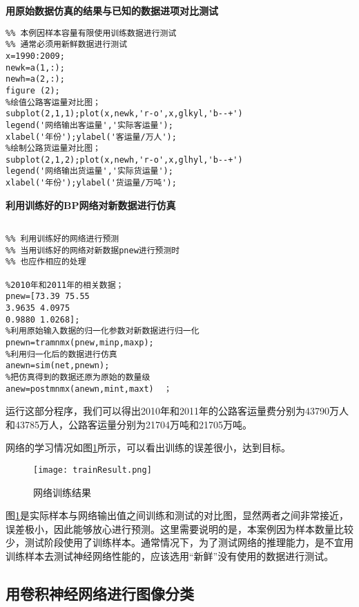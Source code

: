 \documentclass[bwprint]{cumcmthesis}
\begin{document}
\textbf{用原始数据仿真的结果与已知的数据进项对比测试}

\lstset{language=MatLab}
\begin{lstlisting}
%% 本例因样本容量有限使用训练数据进行测试
%% 通常必须用新鲜数据进行测试
x=1990:2009;
newk=a(1,:);
newh=a(2,:);
figure (2);
%绘值公路客运量对比图；
subplot(2,1,1);plot(x,newk,'r-o',x,glkyl,'b--+')    
legend('网络输出客运量','实际客运量');
xlabel('年份');ylabel('客运量/万人');
%绘制公路货运量对比图；
subplot(2,1,2);plot(x,newh,'r-o',x,glhyl,'b--+')     
legend('网络输出货运量','实际货运量');
xlabel('年份');ylabel('货运量/万吨');
\end{lstlisting}

\textbf{利用训练好的BP网络对新数据进行仿真}

\lstset{language=MatLab}
\begin{lstlisting}

%% 利用训练好的网络进行预测
%% 当用训练好的网络对新数据pnew进行预测时
%% 也应作相应的处理

%2010年和2011年的相关数据；
pnew=[73.39 75.55
3.9635 4.0975
0.9880 1.0268];   
%利用原始输入数据的归一化参数对新数据进行归一化        
pnewn=tramnmx(pnew,minp,maxp); 
%利用归一化后的数据进行仿真
anewn=sim(net,pnewn);    
%把仿真得到的数据还原为原始的数量级        
anew=postmnmx(anewn,mint,maxt)  ；

\end{lstlisting}

运行这部分程序，我们可以得出2010年和2011年的公路客运量费分别为43790万人和43785万人，公路客运量分别为21704万吨和21705万吨。

网络的学习情况如图\ref{trainResult}所示，可以看出训练的误差很小，达到目标。

\begin{figure}[!h]
	\centering
	\texttt{[image: trainResult.png]}
	\caption{网络训练结果}
	\label{trainResult}
\end{figure}

 图\ref{trainResult}是实际样本与网络输出值之间训练和测试的对比图，显然两者之间非常接近，误差极小，因此能够放心进行预测。这里需要说明的是，本案例因为样本数量比较少，测试阶段使用了训练样本。通常情况下，为了测试网络的推理能力，是不宜用训练样本去测试神经网络性能的，应该选用“新鲜”没有使用的数据进行测试。



\subsection{用卷积神经网络进行图像分类}
\end{document}
